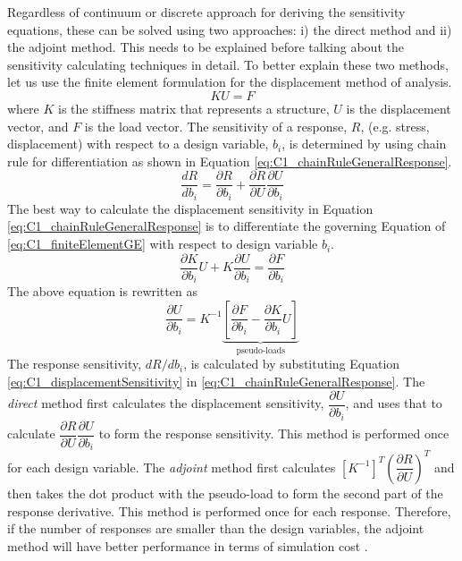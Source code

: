 Regardless of continuum or discrete approach for deriving the sensitivity equations, these can be solved using two approaches: i) the direct method and ii) the adjoint method. This needs to be explained before talking about the sensitivity calculating techniques in detail. To better explain these two methods, let us use the finite element formulation for the displacement method of analysis.
%
\begin{equation}\label{eq:C1_finiteElementGE}
	KU = F
\end{equation}
%
where $K$ is the stiffness matrix that represents a structure, $U$ is the displacement vector, and $F$ is the load vector. The sensitivity of a response, $R$, (e.g. stress, displacement) with respect to a design variable, $b_i$, is determined by using chain rule for differentiation as shown in Equation \eqref{eq:C1_chainRuleGeneralResponse}.
%
\begin{equation}\label{eq:C1_chainRuleGeneralResponse}
	\frac{dR}{db_i} = \frac{\partial R}{\partial b_i} + 
	                  \frac{\partial R}{\partial U} \frac{\partial U}{\partial b_i}
\end{equation}
%
The best way to calculate the displacement sensitivity in Equation \eqref{eq:C1_chainRuleGeneralResponse} is to differentiate the governing Equation of \eqref{eq:C1_finiteElementGE} with respect to design variable $b_i$. 
%
\begin{equation*}
	\frac{\partial K}{\partial b_i} U + K \frac{\partial U}{\partial b_i} = \frac{\partial F}{\partial b_i}
\end{equation*}
%
The above equation is rewritten as
%
\begin{equation}\label{eq:C1_displacementSensitivity}
	\frac{\partial U}{\partial b_i} = 
	K^{-1} \underbrace{\left[ \frac{\partial F}{\partial b_i} - \frac{\partial K}{\partial b_i} U \right]}_\text{pseudo-loads}
\end{equation}
%
The response sensitivity, $dR/db_i$, is calculated by substituting Equation \eqref{eq:C1_displacementSensitivity} in \eqref{eq:C1_chainRuleGeneralResponse}. The \emph{direct} method first calculates the displacement sensitivity, $\dfrac{\partial U}{\partial b_i}$, and uses that to calculate $\dfrac{\partial R}{\partial U} \dfrac{\partial U}{\partial b_i}$ to form the response sensitivity. This method is performed once for each design variable. The \emph{adjoint} method first calculates $[K^{-1}]^T \left( \dfrac{\partial R}{\partial U}\right)^T$ and then takes the dot product with the pseudo-load to form the second part of the response derivative. This method is performed once for each response. Therefore, if the number of responses are smaller than the design variables, the adjoint method will have better performance in terms of simulation cost \cite{vanderplaats1984numerical}.

